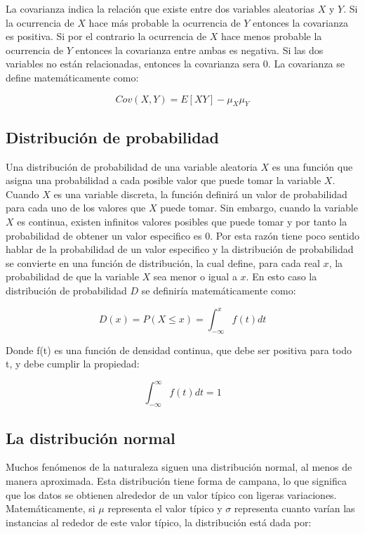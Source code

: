 \documentclass[a4paper, 11pt, oneside]{report}
\begin{document}
La covarianza indica la relación que existe entre dos variables aleatorias $X$ y $Y$. Si la ocurrencia de $X$ hace más probable la ocurrencia de $Y$ entonces la covarianza es positiva. Si por el contrario la ocurrencia de $X$ hace menos probable la ocurrencia de $Y$ entonces la covarianza entre ambas es negativa. Si las dos variables no están relacionadas, entonces la covarianza sera 0. La covarianza se define matemáticamente como:

	\[Cov(X, Y) = E[XY] - \mu_X\mu_Y\]

\subsection{Distribución de probabilidad}

Una distribución de probabilidad de una variable aleatoria $X$ es una función que asigna una probabilidad a cada posible valor que puede tomar la variable $X$. Cuando $X$ es una variable discreta, la función definirá un valor de probabilidad para cada uno de los valores que $X$ puede tomar. Sin embargo, cuando la variable $X$ es continua, existen infinitos valores posibles que puede tomar y por tanto la probabilidad de obtener un valor especifico es 0. Por esta razón tiene poco sentido hablar de la probabilidad de un valor especifico y la distribución de probabilidad se convierte en una función de distribución, la cual define, para cada real $x$, la probabilidad de que la variable $X$ sea menor o igual a $x$. En esto caso la distribución de probabilidad $D$ se definiría matemáticamente como:

	\[D(x) = P(X \leq x) = \int_{-\infty}^x{f(t)dt}\]

Donde f(t) es una función de densidad continua, que debe ser positiva para todo t, y debe cumplir la propiedad:

	\[\int_{-\infty}^{\infty}{f(t)dt} = 1\]
	
\subsection{La distribución normal}

Muchos fenómenos de la naturaleza siguen una distribución normal, al menos de manera aproximada. Esta distribución tiene forma de campana, lo que significa que los datos se obtienen alrededor de un valor típico con ligeras variaciones. Matemáticamente, si $\mu$ representa el valor típico y $\sigma$ representa cuanto varían las instancias al rededor de este valor típico, la distribución está dada por:
\end{document}
